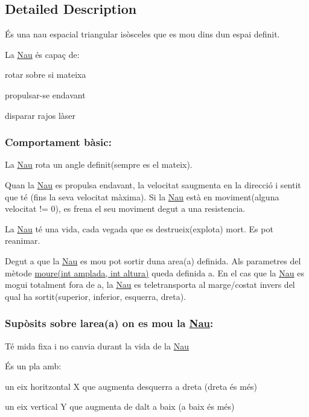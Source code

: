 \subsection{Detailed Description}
És una nau espacial triangular isòsceles que es mou dins d\textquotesingle{}un espai definit. 

La \hyperlink{class_nau}{Nau} és capaç de\+:
\begin{DoxyItemize}
\item rotar sobre si mateixa
\item propulsar-\/se endavant
\item disparar rajos làser
\end{DoxyItemize}

\subsubsection*{Comportament bàsic\+: }

La \hyperlink{class_nau}{Nau} rota un angle definit(sempre es el mateix).

Quan la \hyperlink{class_nau}{Nau} es propulsa endavant, la velocitat s\textquotesingle{}augmenta en la direcció i sentit que té (fins la seva velocitat màxima). Si la \hyperlink{class_nau}{Nau} està en moviment(alguna velocitat != 0), es frena el seu moviment degut a una resistencia.

La \hyperlink{class_nau}{Nau} té una vida, cada vegada que es destrueix(explota) mort. Es pot reanimar.

Degut a que la \hyperlink{class_nau}{Nau} es mou pot sortir d\textquotesingle{}una area(a) definida. Als parametres del mètode \hyperlink{class_nau_a8dc46f91e02910b92bfad9b798f6552c}{moure(int amplada, int altura)} queda definida a. En el cas que la \hyperlink{class_nau}{Nau} es mogui totalment fora de a, la \hyperlink{class_nau}{Nau} es teletransporta al marge/costat invers del qual ha sortit(superior, inferior, esquerra, dreta).

\subsubsection*{Supòsits sobre l\textquotesingle{}area(a) on es mou la \hyperlink{class_nau}{Nau}\+: }

Té mida fixa i no canvia durant la vida de la \hyperlink{class_nau}{Nau}

És un pla amb\+:
\begin{DoxyItemize}
\item un eix horitzontal X que augmenta d\textquotesingle{}esquerra a dreta (dreta és més)
\item un eix vertical Y que augmenta de dalt a baix (a baix és més)
\end{DoxyItemize}

